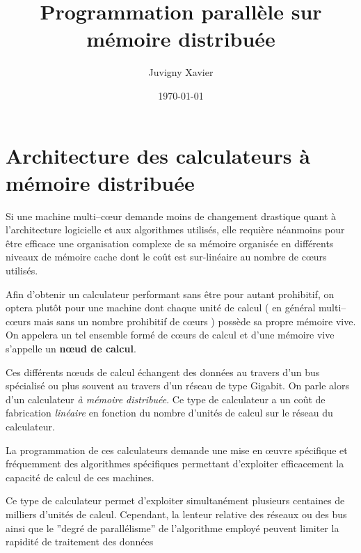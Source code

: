 \documentclass[fleqn,11pt]{article}
\title{Programmation parallèle sur mémoire distribuée}
\author{Juvigny Xavier}
\date{\today}
\begin{document}
\maketitle
\tableofcontents

\section{Architecture des calculateurs à mémoire distribuée}

Si une machine multi--c{\oe}ur demande moins de changement drastique quant à l'architecture logicielle et aux algorithmes
utilisés, elle requière néanmoins pour être efficace une organisation complexe de sa mémoire organisée en différents
niveaux de mémoire cache dont le coût est sur-linéaire au nombre de c{\oe}urs utilisés. 

Afin d'obtenir un calculateur performant sans être pour autant prohibitif, on optera plutôt pour une machine dont chaque
unité de calcul ( en général multi--cœurs mais sans un nombre prohibitif de c{\oe}urs ) possède  sa propre mémoire vive. 
On appelera un tel ensemble formé de c{\oe}urs de calcul et  d'une mémoire vive s'appelle un \textbf{nœud de calcul}.

Ces différents n{\oe}uds de calcul échangent des données au travers d'un bus spécialisé ou  plus souvent au travers d'un réseau de type Gigabit. On parle alors d'un calculateur \textsl{à mémoire distribuée}. Ce type de calculateur a un coût de fabrication \textsl{linéaire} en fonction du nombre d'unités de calcul sur le réseau du calculateur. 

La programmation de ces calculateurs demande une mise en œuvre spécifique et fréquemment des algorithmes spécifiques permettant d'exploiter efficacement la capacité de calcul de ces machines.

Ce type de calculateur permet d'exploiter simultanément plusieurs centaines de milliers d'unités de calcul. Cependant, la lenteur relative des réseaux ou des bus ainsi que le ''degré de parallélisme'' de l'algorithme employé peuvent limiter la rapidité de traitement des données
\end{document}
